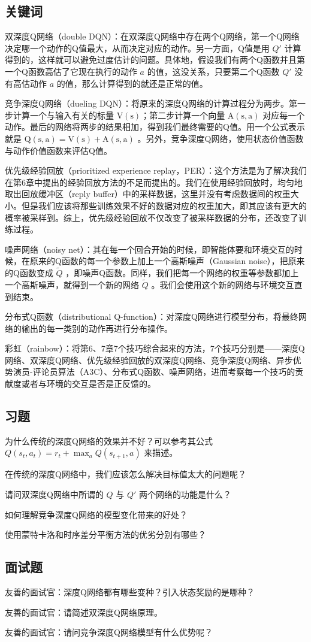 \subsection{关键词}

双深度Q网络（double DQN）：在双深度Q网络中存在两个Q网络，第一个Q网络决定哪一个动作的Q值最大，从而决定对应的动作。另一方面，Q值是用 $Q'$ 计算得到的，这样就可以避免过度估计的问题。具体地，假设我们有两个Q函数并且第一个Q函数高估了它现在执行的动作 $a$ 的值，这没关系，只要第二个Q函数 $Q'$ 没有高估动作 $a$ 的值，那么计算得到的就还是正常的值。

竞争深度Q网络（dueling DQN）：将原来的深度Q网络的计算过程分为两步。第一步计算一个与输入有关的标量 $\mathrm{V(s)}$；第二步计算一个向量 $\mathrm{A(s,a)}$ 对应每一个动作。最后的网络将两步的结果相加，得到我们最终需要的Q值。用一个公式表示就是 $\mathrm{Q(s,a)=V(s)+A(s,a)}$ 。另外，竞争深度Q网络，使用状态价值函数与动作价值函数来评估Q值。

优先级经验回放（prioritized experience replay，PER）：这个方法是为了解决我们在第6章中提出的经验回放方法的不足而提出的。我们在使用经验回放时，均匀地取出回放缓冲区（reply buffer）中的采样数据，这里并没有考虑数据间的权重大小。但是我们应该将那些训练效果不好的数据对应的权重加大，即其应该有更大的概率被采样到。综上，优先级经验回放不仅改变了被采样数据的分布，还改变了训练过程。

噪声网络（noisy net）：其在每一个回合开始的时候，即智能体要和环境交互的时候，在原来的Q函数的每一个参数上加上一个高斯噪声（Gaussian noise），把原来的Q函数变成 $\tilde{Q}$ ，即噪声Q函数。同样，我们把每一个网络的权重等参数都加上一个高斯噪声，就得到一个新的网络 $\tilde{Q}$ 。我们会使用这个新的网络与环境交互直到结束。

分布式Q函数（distributional Q-function）：对深度Q网络进行模型分布，将最终网络的输出的每一类别的动作再进行分布操作。

彩虹（rainbow）：将第6、7章7个技巧综合起来的方法，7个技巧分别是——深度Q网络、双深度Q网络、优先级经验回放的双深度Q网络、竞争深度Q网络、异步优势演员-评论员算法（A3C）、分布式Q函数、噪声网络，进而考察每一个技巧的贡献度或者与环境的交互是否是正反馈的。


\subsection{习题}

 为什么传统的深度Q网络的效果并不好？可以参考其公式 $Q(s_t ,a_t)=r_t+\max_{a}Q(s_{t+1},a)$ 来描述。

 在传统的深度Q网络中，我们应该怎么解决目标值太大的问题呢？

 请问双深度Q网络中所谓的 $Q$ 与 $Q'$ 两个网络的功能是什么？

 如何理解竞争深度Q网络的模型变化带来的好处？

 使用蒙特卡洛和时序差分平衡方法的优劣分别有哪些？


\subsection{面试题}

 友善的面试官：深度Q网络都有哪些变种？引入状态奖励的是哪种？

 友善的面试官：请简述双深度Q网络原理。

 友善的面试官：请问竞争深度Q网络模型有什么优势呢？
